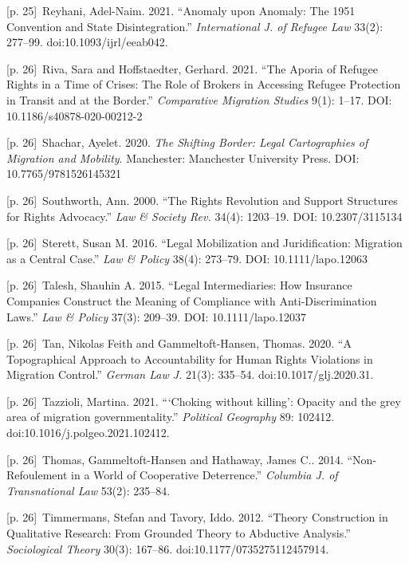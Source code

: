 \documentclass[10pt,a4paper]{article}
\begin{document}
{\scriptsize\color{gray} [p. 25]}\ Reyhani, Adel-Naim. 2021. “Anomaly upon Anomaly: The 1951 Convention and State Disintegration.” \textit{International J. of Refugee Law} 33(2): 277–99. doi:10.1093/ijrl/eeab042.\par
{\scriptsize\color{gray} [p. 26]}\ Riva, Sara and Hoffstaedter, Gerhard. 2021. “The Aporia of Refugee Rights in a Time of Crises: The Role of Brokers in Accessing Refugee Protection in Transit and at the Border.” \textit{Comparative Migration Studies} 9(1): 1–17. DOI: 10.1186/s40878-020-00212-2\par
{\scriptsize\color{gray} [p. 26]}\ Shachar, Ayelet. 2020. \textit{The Shifting Border: Legal Cartographies of Migration and Mobility}. Manchester: Manchester University Press. DOI: 10.7765/9781526145321\par
{\scriptsize\color{gray} [p. 26]}\ Southworth, Ann. 2000. “The Rights Revolution and Support Structures for Rights Advocacy.” \textit{Law \& Society Rev.} 34(4): 1203–19. DOI: 10.2307/3115134\par
{\scriptsize\color{gray} [p. 26]}\ Sterett, Susan M. 2016. “Legal Mobilization and Juridification: Migration as a Central Case.” \textit{Law \& Policy} 38(4): 273–79. DOI: 10.1111/lapo.12063\par
{\scriptsize\color{gray} [p. 26]}\ Talesh, Shauhin A. 2015. “Legal Intermediaries: How Insurance Companies Construct the Meaning of Compliance with Anti-Discrimination Laws.” \textit{Law \& Policy} 37(3): 209–39. DOI: 10.1111/lapo.12037\par
{\scriptsize\color{gray} [p. 26]}\ Tan, Nikolas Feith and Gammeltoft-Hansen, Thomas. 2020. “A Topographical Approach to Accountability for Human Rights Violations in Migration Control.” \textit{German Law J.} 21(3): 335–54. doi:10.1017/glj.2020.31.\par
{\scriptsize\color{gray} [p. 26]}\ Tazzioli, Martina. 2021. “‘Choking without killing’: Opacity and the grey area of migration governmentality.” \textit{Political Geography} 89: 102412. doi:10.1016/j.polgeo.2021.102412.\par
{\scriptsize\color{gray} [p. 26]}\ Thomas, Gammeltoft-Hansen and Hathaway, James C.. 2014. “Non-Refoulement in a World of Cooperative Deterrence.” \textit{Columbia J. of Transnational Law} 53(2): 235–84.\par
{\scriptsize\color{gray} [p. 26]}\ Timmermans, Stefan and Tavory, Iddo. 2012. “Theory Construction in Qualitative Research: From Grounded Theory to Abductive Analysis.” \textit{Sociological Theory} 30(3): 167–86. doi:10.1177/0735275112457914.\par
\end{document}
